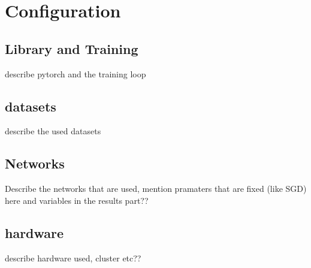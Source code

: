 \section{Configuration}

\subsection{Library and Training}
describe pytorch and the training loop

\subsection{datasets}
describe the used datasets
\subsection{Networks}
Describe the networks that are used,
mention pramaters that are fixed (like SGD) here and variables in the results part??
\subsection{hardware}
describe hardware used, cluster etc??
